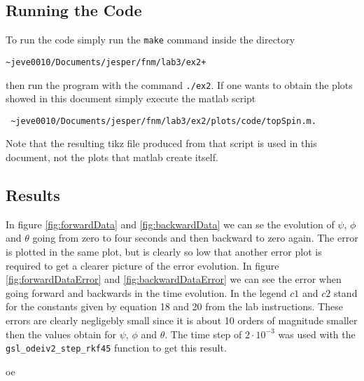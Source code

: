 \documentclass[11pt]{article}
\newif\iftikz
\begin{document}
\subsection{Running the Code}
To run the code simply run the \verb+make+ command inside the directory 
\begin{verbatim}
~jeve0010/Documents/jesper/fnm/lab3/ex2+
\end{verbatim}
 then run the program with the command \verb+./ex2+. If one wants to obtain the plots showed in this document simply execute the matlab script 
\begin{verbatim}
 ~jeve0010/Documents/jesper/fnm/lab3/ex2/plots/code/topSpin.m.
\end{verbatim}
Note that the resulting tikz file produced from that script is used in this document, not the plots that matlab create itself.


\subsection{Results}
In figure \ref{fig:forwardData} and \ref{fig:backwardData} we can se the evolution of $\psi$, $\phi$ and $\theta$ going from zero to four seconds and then backward to zero again. The error is plotted in the same plot, but is clearly so low that another error plot is required to get a clearer picture of the error evolution. In figure \ref{fig:forwardDataError} and \ref{fig:backwardDataError} we can see the error when going forward and backwards in the time evolution. In the legend $c1$ and $c2$ stand for the constants given by equation 18 and 20 from the lab instructions. These errors are clearly negligebly small since it is about 10 orders of magnitude smaller then the values obtain for $\psi$, $\phi$ and $\theta$. The time step of $2\cdot10^{-3}$ was used with the \verb+gsl_odeiv2_step_rkf45+ function to get this result.
\iftikz
\begin{figure}[H]
	\centering
	\newlength\figureheight 
	\newlength\figurewidth 
	\setlength\figureheight{7cm} 
	\setlength\figurewidth{14cm}
	
	\caption{Showing the angle evolution for the spinning top problem over 4 seconds.}
	\label{fig:forwardData}
\end{figure}
\fi
\iftikz
\begin{figure}[H]
	\centering
	\setlength\figureheight{7cm} 
	\setlength\figurewidth{14cm}
	
	\caption{Showing the angle evolution for the spinning top problem when going backwards in time.}
	\label{fig:backwardData}
\end{figure}
\fi
\iftikz
\begin{figure}[H]
	\centering
	\setlength\figureheight{7cm} 
	\setlength\figurewidth{14cm}
	
	\caption{A zoom in on the error when stepping forward in time.}
	\label{fig:forwardDataError}
\end{figure}
\fi
oe
\iftikz
\begin{figure}[H]
	\centering
	\setlength\figureheight{7cm} 
	\setlength\figurewidth{14cm}
	
	\caption{A zoom in on the error when stepping backwards in time.}
	\label{fig:backwardDataError}
\end{figure}
\fi
\end{document}
